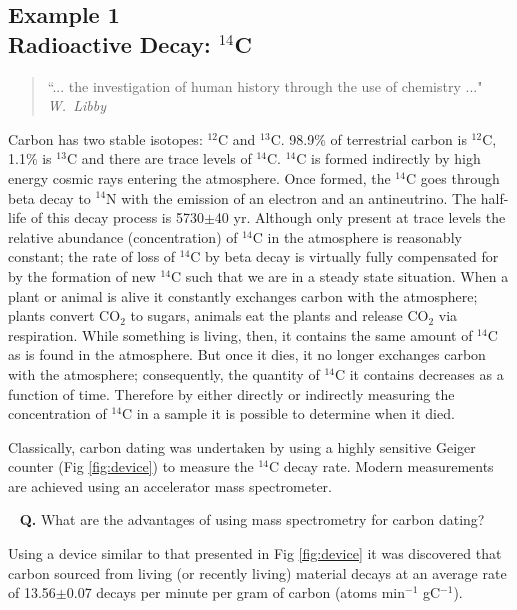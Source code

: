 \documentclass[	DIV=calc,%
							paper=a4,%
							fontsize=11pt,%
							twocolumn]{scrartcl}	 					%
\begin{document}
\subsection*{Example 1\\Radioactive Decay: $^{14}$C}
\begin{quote}
    \normalsize{``... the investigation of human history through the use of chemistry ..."}
    \\\emph{W.~Libby}
\end{quote}
Carbon has two stable isotopes: $^{12}\mathrm{C}$ and $^{13}\mathrm{C}$. 98.9\% of terrestrial carbon is $^{12}\mathrm{C}$, 1.1\% is $^{13}\mathrm{C}$ and there are trace levels of $^{14}\mathrm{C}$. $^{14}\mathrm{C}$ is formed indirectly by high energy cosmic rays entering the atmosphere. Once formed, the $^{14}\mathrm{C}$ goes through beta decay to $^{14}\mathrm{N}$ with the emission of an electron and an antineutrino. The half-life of this decay process is 5730$\pm$40 yr. Although only present at trace levels the relative abundance (concentration) of $^{14}\mathrm{C}$ in the atmosphere is reasonably constant; the rate of loss of $^{14}\mathrm{C}$ by beta decay is virtually fully compensated for by the formation of new $^{14}\mathrm{C}$ such that we are in a steady state situation. When a plant or animal is alive it constantly exchanges carbon with the atmosphere; plants convert CO$_2$ to sugars, animals eat the plants and release CO$_2$ via respiration. While something is living, then, it contains the same amount of $^{14}\mathrm{C}$ as is found in the atmosphere. But once it dies, it no longer exchanges carbon with the atmosphere; consequently, the quantity of $^{14}\mathrm{C}$ it contains decreases as a function of time. Therefore by either directly or indirectly measuring the concentration of  $^{14}\mathrm{C}$ in a sample it is possible to determine when it died.

Classically, carbon dating was undertaken by using a highly sensitive Geiger counter (Fig \ref{fig:device}) to measure the $^{14}\mathrm{C}$ decay rate. Modern measurements are achieved using an accelerator mass spectrometer.

~
\newline
\textbf{Q.} What are the advantages of using \newline mass spectrometry for carbon dating?

\newpage
Using a device similar to that presented in Fig \ref{fig:device} it was discovered that carbon sourced from living (or recently living) material decays at an average rate of 13.56$\pm$0.07 decays per minute per gram of carbon (atoms min$^{-1}$ gC$^{-1}$). 
\end{document}
